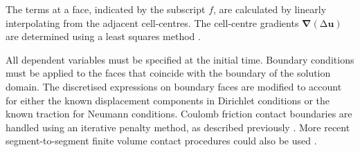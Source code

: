 \documentclass[sn-mathphys,Numbered]{sn-jnl}%
\newcommand{\bb}{\boldsymbol}
\begin{document}
The terms at a face, indicated by the subscript $f$, are calculated by linearly interpolating from the adjacent cell-centres.
The cell-centre gradients $\bb{\nabla}\left(\mathrm{\Delta}\bb{u}\right)$ are determined using a least squares method \cite{noauthor_openfoam_2015}.




All dependent variables must be specified at the initial time.
Boundary conditions must be applied to the faces that coincide with the boundary of the solution domain.
The discretised expressions on boundary faces are modified to account for either the known displacement components in Dirichlet conditions or the known traction for Neumann conditions.
Coulomb friction contact boundaries are handled using an iterative penalty method, as described previously \citep{cardiff_lagrangian_2017, cardiff_development_2012}.
More recent segment-to-segment finite volume contact procedures could also be used \citep{Batistic2022, Batistic2023}.
\end{document}
